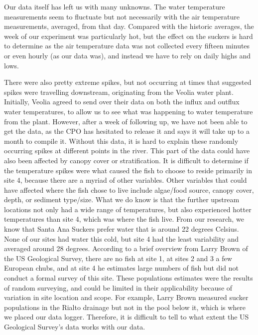 \documentclass{article}
\begin{document}
Our data itself has left us with many unknowns. The water temperature measurements seem to fluctuate but not necessarily with the air temperature measurements, averaged, from that day. Compared with the historic averages, the week of our experiment was particularly hot, but the effect on the suckers is hard to determine as the air temperature data was not collected every fifteen minutes or even hourly (as our data was), and instead we have to rely on daily highs and lows. 


There were also pretty extreme spikes, but not occurring at times that suggested spikes were travelling downstream, originating from the Veolia water plant. Initially, Veolia agreed to send over their data on both the influx and outflux water temperatures, to allow us to see what was happening to water temperature from the plant. However, after a week of following up, we have not been able to get the data, as the CPO has hesitated to release it and says it will take up to a month to compile it. Without this data, it is hard to explain these randomly occurring spikes at different points in the river. This part of the data could have also been affected by canopy cover or stratification. 
It is difficult to determine if the temperature spikes were what caused the fish to choose to reside primarily in site 4, because there are a myriad of other variables. Other variables that could have affected where the fish chose to live include algae/food source, canopy cover, depth, or sediment type/size. What we do know is that the further upstream locations not only had a wide range of temperatures, but also experienced hotter temperatures than site 4, which was where the fish live. From our research, we know that Santa Ana Suckers prefer water that is around 22 degrees Celsius. None of our sites had water this cold, but site 4 had the least variability and averaged around 28 degrees. According to a brief overview from Larry Brown of the US Geological Survey, there are no fish at site 1, at sites 2 and 3 a few European chubs, and at site 4 he estimates large numbers of fish but did not conduct a formal survey of this site. These populations estimates were the results of random surveying, and could be limited in their applicability because of variation in site location and scope. For example, Larry Brown measured sucker populations in the Rialto drainage but not in the pool below it, which is where we placed our data logger. Therefore, it is difficult to tell to what extent the US Geological Survey’s data works with our data. 
\end{document}
